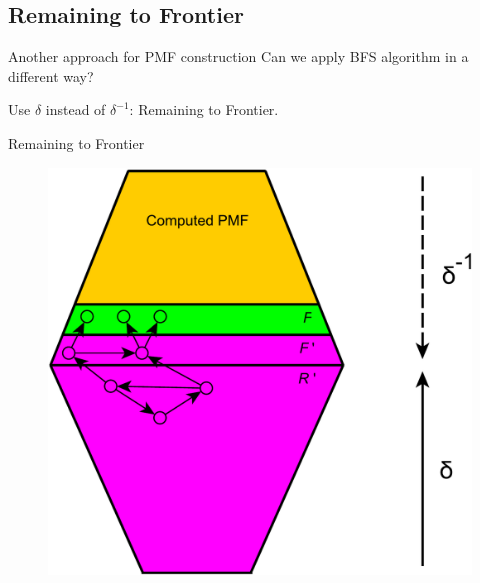 \documentclass{beamer}
\begin{document}
\subsection{Remaining to Frontier}

\begin{frame}{Another approach for PMF construction}
Can we apply BFS algorithm in a different way?

Use $\delta$ instead of $\delta^{-1}$: \alert{Remaining to Frontier}.
\end{frame}


\begin{frame}{Remaining to Frontier}
	\begin{figure}
		\includegraphics[height=0.8\textheight]{figs/r2f.pdf}
	\end{figure}
\end{frame}
\end{document}
